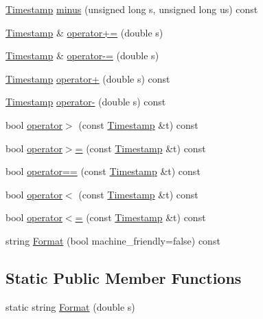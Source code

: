 \begin{DoxyCompactItemize}
\item 
\mbox{\hyperlink{class_d_utils_1_1_timestamp}{Timestamp}} \mbox{\hyperlink{class_d_utils_1_1_timestamp_a5777e11b3f04827e2c310c0ab147e5bf}{minus}} (unsigned long s, unsigned long us) const
\item 
\mbox{\hyperlink{class_d_utils_1_1_timestamp}{Timestamp}} \& \mbox{\hyperlink{class_d_utils_1_1_timestamp_a609bb289c3833fd6c26c9ee831074a11}{operator+=}} (double s)
\item 
\mbox{\hyperlink{class_d_utils_1_1_timestamp}{Timestamp}} \& \mbox{\hyperlink{class_d_utils_1_1_timestamp_a775ece4a7fab156430da57da985a8965}{operator-\/=}} (double s)
\item 
\mbox{\hyperlink{class_d_utils_1_1_timestamp}{Timestamp}} \mbox{\hyperlink{class_d_utils_1_1_timestamp_a12ecf62650e5582707cf9fb30f1b2d87}{operator+}} (double s) const
\item 
\mbox{\hyperlink{class_d_utils_1_1_timestamp}{Timestamp}} \mbox{\hyperlink{class_d_utils_1_1_timestamp_adfccd22d119468b931e7144ceb9d08da}{operator-\/}} (double s) const
\item 
bool \mbox{\hyperlink{class_d_utils_1_1_timestamp_ad77ef43cab29f8f588bd47d74c1a8cce}{operator$>$}} (const \mbox{\hyperlink{class_d_utils_1_1_timestamp}{Timestamp}} \&t) const
\item 
bool \mbox{\hyperlink{class_d_utils_1_1_timestamp_ade494d1dad26c52bf93c189342a1a69a}{operator$>$=}} (const \mbox{\hyperlink{class_d_utils_1_1_timestamp}{Timestamp}} \&t) const
\item 
bool \mbox{\hyperlink{class_d_utils_1_1_timestamp_a42280e1193a6af2ac41362cf18a1185c}{operator==}} (const \mbox{\hyperlink{class_d_utils_1_1_timestamp}{Timestamp}} \&t) const
\item 
bool \mbox{\hyperlink{class_d_utils_1_1_timestamp_a5ec33cb0b7230946e02e4afa050c445c}{operator$<$}} (const \mbox{\hyperlink{class_d_utils_1_1_timestamp}{Timestamp}} \&t) const
\item 
bool \mbox{\hyperlink{class_d_utils_1_1_timestamp_a4fe0620f1df3aaa4d30ce9a8ba989f77}{operator$<$=}} (const \mbox{\hyperlink{class_d_utils_1_1_timestamp}{Timestamp}} \&t) const
\item 
string \mbox{\hyperlink{class_d_utils_1_1_timestamp_ad2ce60eeec43f9fa86379ed8b269ab64}{Format}} (bool machine\+\_\+friendly=false) const
\end{DoxyCompactItemize}
\subsection*{Static Public Member Functions}
\begin{DoxyCompactItemize}
\item 
static string \mbox{\hyperlink{class_d_utils_1_1_timestamp_abd63d0a2abc2209f9300296ee3e85265}{Format}} (double s)
\end{DoxyCompactItemize}
